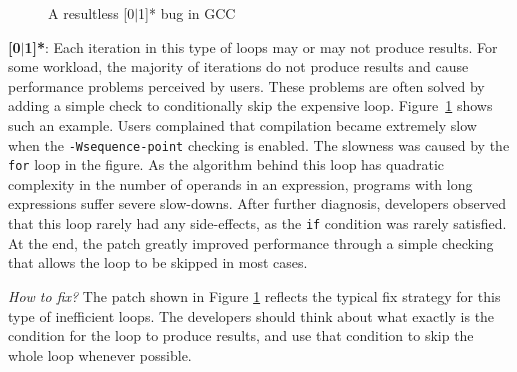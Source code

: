 \begin{figure}
\centering
{}
  \mbox{}
\caption{A resultless [0$|$1]* bug in GCC }
\label{fig:GCC46401}
\end{figure}


{\textbf{[0$|$1]*}}:
Each iteration in this type of loops may or may not produce results.
For some workload, the majority of iterations do not produce
results and cause performance problems perceived by users.
These problems are often solved
by adding a simple check to conditionally skip the expensive loop.
Figure~\ref{fig:GCC46401} shows such an example.
Users complained that compilation became extremely slow when
the \texttt{-Wsequence-point} checking is enabled.
The slowness was caused
by the \texttt{for} loop in the figure. As the algorithm
behind this loop has quadratic complexity in the number of operands in an expression, 
programs with long expressions suffer severe slow-downs.
After further diagnosis, developers observed that this loop rarely
had any side-effects, as the \texttt{if} condition was rarely satisfied.
At the end, the patch greatly improved performance through a
simple checking that allows the loop to be
skipped in most cases.

{\textit{How to fix?}}
The patch shown in Figure \ref{fig:GCC46401} reflects the typical fix
strategy for this type of inefficient loops. The developers should 
think about what exactly is the condition for the loop to produce
results, and use that condition to skip the whole loop
whenever possible.

\comment{
\textcolor{red}{ 
For example, a long expression inside the bug-triggering input exposes the super-linear 
inefficiency of checking violation of sequence point rule for GCC\#46401. 
Each operand on the expression will be compared with all previous operands on the same expression.
When fixing the bug,
developers notice that each operand on the buggy expression has a special feature which make the violation checking never 
report warning (generate results). 
The patch designed by developers is to add an extra condition checking to skip the violation checking for operands with that feature.    
}
}

